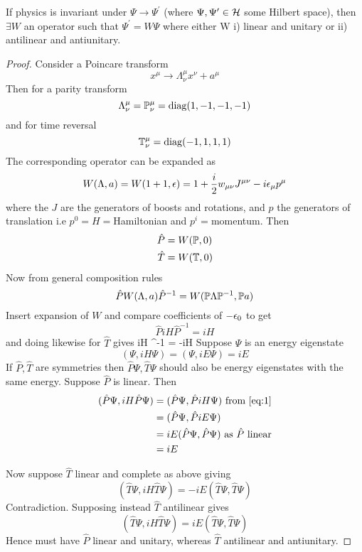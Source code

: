 \documentclass{article}
\begin{document}
\begin{theorem}[Winger]
If physics is invariant under $\Psi \to \Psi^\prime$ (where $\Psi, \Psi^\prime \in \mathcal{H}$ some Hilbert space), then $\exists W$ an operator such that $\Psi^\prime = W\Psi$ where either W i) linear and unitary or ii) antilinear and antiunitary. 
\end{theorem}
\begin{proof}
Consider a Poincare transform 
\[
x^\mu \to \Lambda^\mu_\nu x^\nu + a^\mu
\]
Then for a parity transform 
\[
\Lambda^\mu_\nu = \mathbb{P}^\mu_\nu = \operatorname{diag}(1,-1,-1,-1)
\]
and for time reversal
\[
\mathbb{T}^\mu_\nu = \operatorname{diag}(-1,1,1,1)
\]
The corresponding operator can be expanded as 
\[
W(\Lambda,a) = W(1+1,\epsilon) = 1+\frac{i}{2} w_{\mu\nu} J^{\mu\nu} - i\epsilon_\mu p^\mu
\]
where the $J$ are the generators of boosts and rotations, and $p$ the generators of translation i.e $p^0=H=$Hamiltonian and $p^i=$momentum. Then
\begin{align*}
    \hat{P} &= W(\mathbb{P},0) \\
    \hat{T} &= W(\mathbb{T},0)
\end{align*}
Now from general composition rules 
\[
\hat{P} W(\Lambda,a) \hat{P}^{-1} = W(\mathbb{P}\Lambda\mathbb{P}^{-1},\mathbb{P}a)
\]
Insert expansion of $W$ and compare coefficients of $-\epsilon_0$ to get 
\[
\hat{P} iH \hat{P}^{-1} = iH
\]
and doing likewise for $\hat{T}$ gives 
\be
{} iH ^{-1} = -iH \label{eq:1}
\ee
Suppose $\Psi$ is an energy eigenstate
\[
(\Psi, iH\Psi) = (\Psi, iE\Psi) = iE
\]
If $\hat{P},\hat{T}$ are symmetries then $\hat{P}\Psi,\hat{T}\Psi$ should also be energy eigenstates with the same energy. 
Suppose $\hat{P}$ is linear. Then
\begin{align*}
(\hat{P}\Psi,iH\hat{P}\Psi) &= (\hat{P}\Psi,\hat{P} iH\Psi) \text{ from \ref{eq:1}} \\ 
&= (\hat{P}\Psi,\hat{P} iE\Psi) \\
&= iE(\hat{P}\Psi,\hat{P}\Psi) \text{ as $\hat{P}$ linear} \\
&= iE 
\end{align*}

Now suppose $\hat{T}$ linear and complete as above giving
\[
(\hat{T}\Psi,iH\hat{T }\Psi) = -iE(\hat{T}\Psi,\hat{T}\Psi)
\]
Contradiction. 
Supposing instead $\hat{T}$ antilinear gives 
\[
(\hat{T}\Psi,iH\hat{T }\Psi) = iE(\hat{T}\Psi,\hat{T}\Psi)
\]
Hence must have $\hat{P}$ linear and unitary, whereas $\hat{T}$ antilinear and antiunitary. 
\end{proof}

\end{document}
